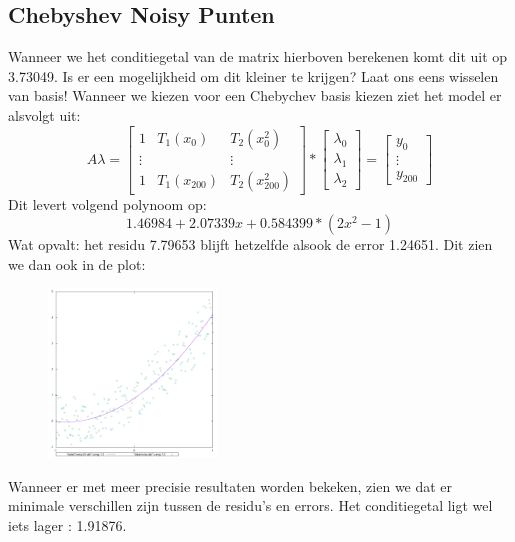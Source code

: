\documentclass[10pt,a4paper,twocolumn]{article}
\begin{document}
\subsection{Chebyshev Noisy Punten}
Wanneer we het conditiegetal van de matrix hierboven berekenen komt dit uit op 3.73049. Is er een mogelijkheid om dit kleiner te krijgen? Laat ons eens wisselen van basis! Wanneer we kiezen voor een Chebychev basis kiezen ziet het model er alsvolgt uit:
$$
A \lambda = \begin{bmatrix}
1 & T_{1}(x_{0} )& T_{2}(x^{2}_{0}) \\ 
\vdots &  & \vdots\\ 
1 & T_{1}(x_{200}) & T_{2}(x^{2}_{200})
\end{bmatrix}
* \begin{bmatrix}
\lambda_{0} \\
\lambda_{1}  \\
\lambda_{2} 
\end{bmatrix}
= \begin{bmatrix}
y_{0} \\
\vdots  \\
y_{200}
\end{bmatrix}
$$
Dit levert volgend polynoom op:
$$ 1.46984 + 2.07339x + 0.584399*(2x^{2}-1)$$
Wat opvalt: het residu 7.79653 blijft hetzelfde alsook  de error 1.24651. Dit zien we dan ook in de plot:
\begin{figure}[H]
\includegraphics[width=0.4\textwidth]{CnoisyLS}
\end{figure}
Wanneer er met meer precisie resultaten worden bekeken, zien we dat er minimale verschillen zijn tussen de residu's en errors. Het conditiegetal ligt wel iets lager : 1.91876.
\end{document}
